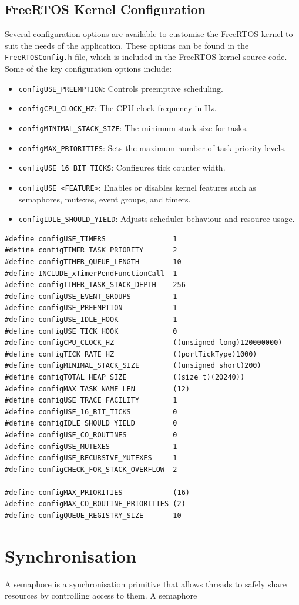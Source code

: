 \documentclass{article}
\begin{document}
\subsection{FreeRTOS Kernel Configuration}
Several configuration options are available to customise the FreeRTOS
kernel to suit the needs of the application. These options can be found
in the \texttt{FreeRTOSConfig.h} file, which is included in the
FreeRTOS kernel source code. Some of the key configuration options
include:
\begin{itemize}
    \item \texttt{configUSE_PREEMPTION}: Controls preemptive scheduling.
    \item \texttt{configCPU_CLOCK_HZ}: The CPU clock frequency in \unit{Hz}.
    \item \texttt{configMINIMAL_STACK_SIZE}: The minimum stack size for tasks.
    \item \texttt{configMAX_PRIORITIES}: Sets the maximum number of task priority levels.
    \item \texttt{configUSE_16_BIT_TICKS}: Configures tick counter width.
    \item \texttt{configUSE_<FEATURE>}: Enables or disables kernel features such as
          semaphores, mutexes, event groups, and timers.
    \item \texttt{configIDLE_SHOULD_YIELD}: Adjusts scheduler behaviour and resource usage.
\end{itemize}
\begin{verbatim}
#define configUSE_TIMERS                1
#define configTIMER_TASK_PRIORITY       2
#define configTIMER_QUEUE_LENGTH        10
#define INCLUDE_xTimerPendFunctionCall  1
#define configTIMER_TASK_STACK_DEPTH    256
#define configUSE_EVENT_GROUPS          1
#define configUSE_PREEMPTION            1
#define configUSE_IDLE_HOOK             1
#define configUSE_TICK_HOOK             0
#define configCPU_CLOCK_HZ              ((unsigned long)120000000)
#define configTICK_RATE_HZ              ((portTickType)1000)
#define configMINIMAL_STACK_SIZE        ((unsigned short)200)
#define configTOTAL_HEAP_SIZE           ((size_t)(20240))
#define configMAX_TASK_NAME_LEN         (12)
#define configUSE_TRACE_FACILITY        1
#define configUSE_16_BIT_TICKS          0
#define configIDLE_SHOULD_YIELD         0
#define configUSE_CO_ROUTINES           0
#define configUSE_MUTEXES               1
#define configUSE_RECURSIVE_MUTEXES     1
#define configCHECK_FOR_STACK_OVERFLOW  2

#define configMAX_PRIORITIES            (16)
#define configMAX_CO_ROUTINE_PRIORITIES (2)
#define configQUEUE_REGISTRY_SIZE       10
\end{verbatim}
\section{Synchronisation}
A semaphore is a synchronisation primitive that allows threads to
safely share resources by controlling access to them. A semaphore
\end{document}
